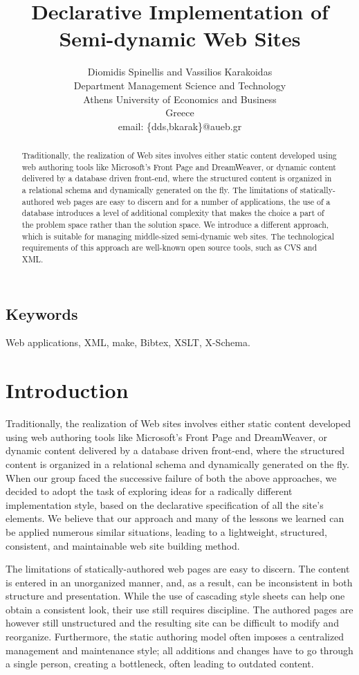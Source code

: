 \documentclass[10pt]{article}
\title{Declarative Implementation of Semi-dynamic Web Sites}
\author{Diomidis Spinellis and Vassilios Karakoidas\\
Department Management Science and Technology \\
Athens University of Economics and Business \\
Greece\\
email: \{dds,bkarak\}@aueb.gr}
\date{}
\begin{document}
\maketitle

\begin{abstract}
\noindent
Traditionally, the realization of Web sites involves either
static content developed using web authoring tools like
Microsoft's Front Page and DreamWeaver, or dynamic
content delivered by a database driven front-end,
where the structured content is organized
in a relational schema and dynamically generated on the fly.
The limitations of statically-authored web pages are easy to discern and
for a number of applications, the use of a database
introduces a level of additional complexity that
makes the choice a part of the problem space rather than the solution space.
We introduce a different approach, which is suitable for managing 
middle-sized semi-dynamic web sites. The technological requirements of this
approach are well-known open source tools, such as CVS and XML.
\end{abstract}

\subsection*{Keywords}
Web applications, XML, make, Bibtex, XSLT, X-Schema.

\section{Introduction}
\label{sec:intro}
Traditionally, the realization of Web sites involves either
static content developed using web authoring tools like
Microsoft's Front Page and DreamWeaver, or dynamic
content delivered by a database driven front-end,
where the structured content is organized
in a relational schema and dynamically generated on the fly.
When our group faced the successive failure of both the above approaches,
we decided to adopt the task of exploring ideas for a radically different
implementation style, based on the declarative specification
of all the site's elements.
We believe that our approach and many of the lessons we learned
can be applied numerous similar situations,
leading to a lightweight, structured, consistent, and maintainable
web site building method.

The limitations of statically-authored web pages are easy to discern.
The content is entered in an unorganized manner, and, as a result,
can be inconsistent in both structure and presentation.
While the use of cascading style sheets can help one obtain a
consistent look, their use still requires discipline.
The authored pages are however still unstructured and the resulting
site can be difficult to modify and reorganize.
Furthermore, the static authoring model often imposes a centralized
management and maintenance style;
all additions and changes have to go through a single person,
creating a bottleneck, often leading to outdated content.
\end{document}
